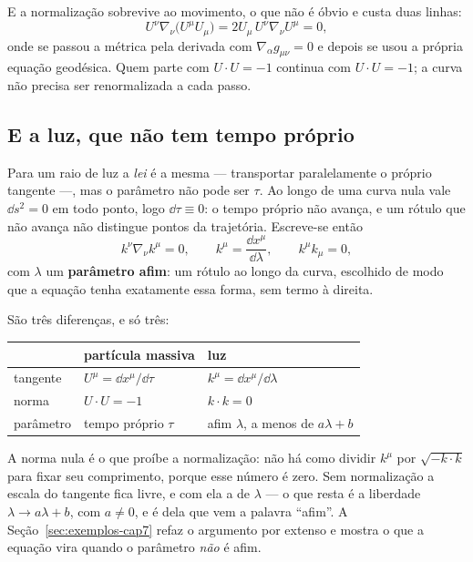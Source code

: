 \documentclass[12pt,a4paper,oneside]{book}
\theoremstyle{rgplain}
\theoremstyle{rgremark}
\begin{document}
E a normalização sobrevive ao movimento, o que não é óbvio e custa duas
linhas:
\[
  U^\nu\nabla_\nu\bigl(U^\mu U_\mu\bigr)
  =2U_\mu\,U^\nu\nabla_\nu U^\mu=0 ,
\]
onde se passou a métrica pela derivada com $\nabla_\alpha g_{\mu\nu}=0$ e
depois se usou a própria equação geodésica. Quem parte com $U\cdot U=-1$
continua com $U\cdot U=-1$; a curva não precisa ser renormalizada a cada
passo.

\subsection*{E a luz, que não tem tempo próprio}

Para um raio de luz a \emph{lei} é a mesma --- transportar paralelamente o
próprio tangente ---, mas o parâmetro não pode ser $\tau$. Ao longo de uma
curva nula vale $\dd s^2=0$ em todo ponto, logo $\dd\tau\equiv0$: o tempo
próprio não avança, e um rótulo que não avança não distingue pontos da
trajetória. Escreve-se então
\begin{equation}
  k^\nu\nabla_\nu k^\mu=0 ,
  \qquad
  k^\mu=\frac{\dd x^\mu}{\dd\lambda} ,
  \qquad
  k^\mu k_\mu=0 ,
  \label{eq:geodesica-nula}
\end{equation}
com $\lambda$ um \textbf{parâmetro afim}: um rótulo ao longo da curva,
escolhido de modo que a equação tenha exatamente essa forma, sem termo à
direita.

São três diferenças, e só três:

\begin{center}
\small
\begin{tabular}{@{}lll@{}}
\toprule
 & \textbf{partícula massiva} & \textbf{luz} \\
\midrule
tangente  & $U^\mu=\dd x^\mu/\dd\tau$ & $k^\mu=\dd x^\mu/\dd\lambda$ \\
norma     & $U\cdot U=-1$             & $k\cdot k=0$ \\
parâmetro & tempo próprio $\tau$      & afim $\lambda$, a menos de $a\lambda+b$ \\
\bottomrule
\end{tabular}
\end{center}

A norma nula é o que proíbe a normalização: não há como dividir $k^\mu$ por
$\sqrt{-k\cdot k}$ para fixar seu comprimento, porque esse número é zero. Sem
normalização a escala do tangente fica livre, e com ela a de $\lambda$ --- o
que resta é a liberdade $\lambda\to a\lambda+b$, com $a\neq0$, e é dela que
vem a palavra ``afim''. A Seção~\ref{sec:exemplos-cap7} refaz o argumento por
extenso e mostra o que a equação vira quando o parâmetro \emph{não} é afim.
\end{document}
